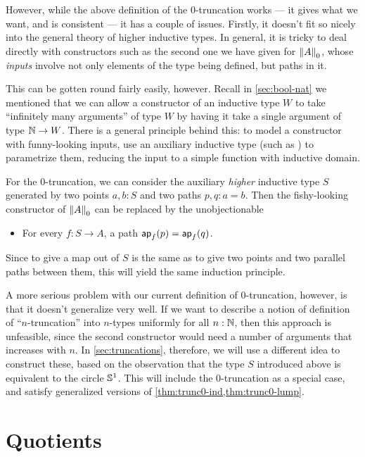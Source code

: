 However, while the above definition of the 0-truncation works --- it gives what we want, and is consistent --- it has a couple of issues.
Firstly, it doesn't fit so nicely into the general theory of higher inductive types.
In general, it is tricky to deal directly with constructors such as the second one we have given for $\trunc0A$, whose \emph{inputs} involve not only elements of the type being defined, but paths in it.

This can be gotten round fairly easily, however.
Recall in \autoref{sec:bool-nat} we mentioned that we can allow a constructor of an inductive type $W$ to take ``infinitely many arguments'' of type $W$ by having it take a single argument of type $\nat\to W$.
There is a general principle behind this: to model a constructor with funny-looking inputs, use an auxiliary inductive type (such as \nat) to parametrize them, reducing the input to a simple function with inductive domain.

For the 0-truncation, we can consider the auxiliary \emph{higher} inductive type $S$ generated by two points $a,b:S$ and two paths $p,q:a=b$.
Then the fishy-looking constructor of $\trunc 0A$ can be replaced by the unobjectionable
\begin{itemize}
\item For every $f:S\to A$, a path $\apfunc{f}(p) = \apfunc{f}(q)$.
\end{itemize}
Since to give a map out of $S$ is the same as to give two points and two parallel paths between them, this will yield the same induction principle.

A more serious problem with our current definition of $0$-truncation, however, is that it doesn't generalize very well.
If we want to describe a notion of definition of ``$n$-truncation'' into $n$-types uniformly for all $n:\nat$, then this approach is unfeasible, since the second constructor would need a number of arguments that increases with $n$.
In \autoref{sec:truncations}, therefore, we will use a different idea to construct these, based on the observation that the type $S$ introduced above is equivalent to the circle $\Sn^1$.
This will include the 0-truncation as a special case, and satisfy generalized versions of \autoref{thm:trunc0-ind,thm:trunc0-lump}.


\section{Quotients}
\label{sec:set-quotients}

